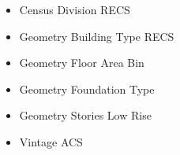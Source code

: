 \begin{itemize}
\item Census Division RECS
\item Geometry Building Type RECS
\item Geometry Floor Area Bin
\item Geometry Foundation Type
\item Geometry Stories Low Rise
\item Vintage ACS
\end{itemize}
